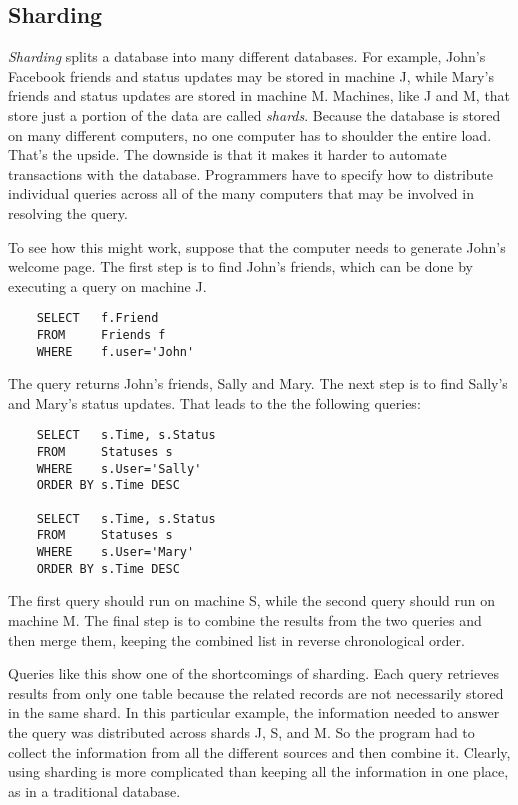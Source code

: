 \subsection{Sharding}

\emph{Sharding} splits a database into many different databases.
For example, John's Facebook friends and status updates may be stored in machine J, while
Mary's friends and status updates are stored in machine M.
Machines, like J and M, that store just a portion of the data are called \emph{shards}.
Because the database is stored on many different computers,
no one computer has to shoulder the entire load.
That's the upside.
The downside is that it makes it harder
to automate transactions with the database.
Programmers have to specify how to distribute
individual queries across all of the many computers
that may be involved in resolving the query.

To see how this might work,
suppose that the computer needs to generate John's welcome page.
The first step is to find John's friends,
which can be done by executing a query on machine J.
\begin{verbatim}
	SELECT   f.Friend
	FROM     Friends f
	WHERE    f.user='John'
\end{verbatim}
The query returns John's friends, Sally and Mary.
The next step is to find Sally's and Mary's status updates.
That leads to the the following queries:
\begin{verbatim}
	SELECT   s.Time, s.Status
	FROM     Statuses s
	WHERE    s.User='Sally'
	ORDER BY s.Time DESC

	SELECT   s.Time, s.Status
	FROM     Statuses s
	WHERE    s.User='Mary'
	ORDER BY s.Time DESC
\end{verbatim}
The first query should run on machine S,
while the second query should run on machine M.
The final step is to combine the results from the two queries
and then merge them, keeping
the combined list in reverse chronological order.

Queries like this show one of the shortcomings of sharding.
Each query retrieves results from only one table
because the related records 
are not necessarily stored in the same shard.
In this particular example, the information needed to answer the query was
distributed across shards J, S, and M.
So the program had to collect the information
from all the different sources and then combine it.
Clearly, using sharding is more complicated
than keeping all the information in one place,
as in a traditional database.

